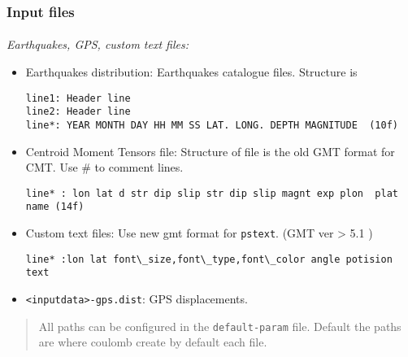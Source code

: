\begin{frame}[t,fragile]
  \frametitle{Input files}
  \framesubtitle{}
  \label{fr2:satgeod3}
\emph{Earthquakes, GPS, custom text files:}

\begin{itemize}
\item
  Earthquakes distribution: Earthquakes catalogue files. Structure is

\begin{verbatim}
line1: Header line
line2: Header line
line*: YEAR MONTH DAY HH MM SS LAT. LONG. DEPTH MAGNITUDE  (10f)
\end{verbatim}
\item
  Centroid Moment Tensors file: Structure of file is the old GMT format
  for CMT. Use \# to comment lines.

\begin{verbatim}
line* : lon lat d str dip slip str dip slip magnt exp plon  plat  name (14f)
\end{verbatim}
\item
  Custom text files: Use new gmt format for \texttt{pstext}. (GMT ver
  \textgreater{} 5.1 )

\begin{verbatim}
line* :lon lat font\_size,font\_type,font\_color angle potision text
\end{verbatim}
\item
  \texttt{\textless{}inputdata\textgreater{}-gps.dist}: GPS
  displacements.
\end{itemize}

\begin{quote}
All paths can be configured in the \texttt{default-param} file. Default
the paths are where coulomb create by default each file.
\end{quote}

\end{frame}
\note{} %














